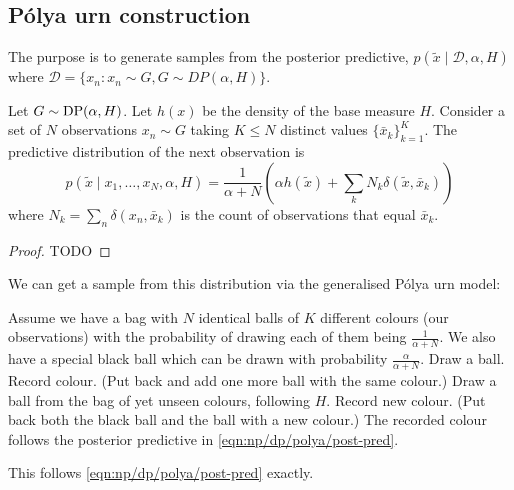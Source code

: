\subsection{Pólya urn construction}
The purpose is to generate samples from the posterior predictive, $p(\tilde x \mid \mathcal D, \alpha, H)$ where $\mathcal D = \{x_n: x_n \sim G, G \sim DP(\alpha, H)\}$.

\begin{theorem}
	Let $G \sim \operatorname{DP}(\alpha, H)$. Let $h(x)$ be the density of the base measure $H$. Consider a set of $N$ observations $x_n \sim G$ taking $K \leq N$ distinct values $\{\bar x_k\}_{k = 1}^K$. The predictive distribution of the next observation is
	\begin{equation}
		p(\tilde x \mid x_1, \dotsc, x_N, \alpha, H) = \frac{1}{\alpha + N} \left(\alpha h(\tilde x) + \sum_k N_k \delta(\tilde x, \bar x_k)\right) \label{eqn:np/dp/polya/post-pred}
	\end{equation}
	where $N_k = \sum_n \delta(x_n, \bar x_k)$ is the count of observations that equal $\bar x_k$.
\end{theorem}

\begin{proof}
	TODO
\end{proof}

We can get a sample from this distribution via the generalised Pólya urn model:
	\begin{algorithmbis}\label{alg:np/dp/polya/polya}
        \begin{algorithmic}[1]
            \State Assume we have a bag with $N$ identical balls of $K$ different colours (our observations) with the probability of drawing each of them being $\frac{1}{\alpha + N}$. We also have a special black ball which can be drawn with probability $\frac{\alpha}{\alpha + N}$.
            \State Draw a ball.
            	\State Record colour.
            	\State (Put back and add one more ball with the same colour.)
            \Else
            	\State Draw a ball from the bag of yet unseen colours, following $H$.
            	\State Record new colour.
            	\State (Put back both the black ball and the ball with a new colour.)
            \EndIf
            \State The recorded colour follows the posterior predictive in \eqref{eqn:np/dp/polya/post-pred}.
        \end{algorithmic}
    \end{algorithmbis}
This follows \eqref{eqn:np/dp/polya/post-pred} exactly.